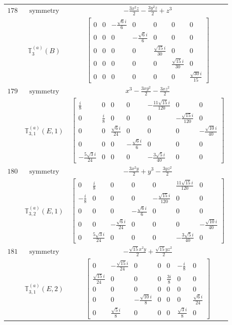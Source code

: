 \documentclass[fleqn,8pt,landscape]{jsarticle}
\begin{document}
\begin{longtable}{ccc}
$ 178 $ & $ \text{symmetry} $ & $ - \frac{3 x^{2} z}{2} - \frac{3 y^{2} z}{2} + z^{3} $ \\
$  $ & $ \mathbb{T}_{3}^{(a)}(B) $ & $ \begin{bmatrix} 0 & 0 & - \frac{\sqrt{6} i}{6} & 0 & 0 & 0 & 0 \\ 0 & 0 & 0 & - \frac{\sqrt{6} i}{6} & 0 & 0 & 0 \\ 0 & 0 & 0 & 0 & \frac{\sqrt{15} i}{30} & 0 & 0 \\ 0 & 0 & 0 & 0 & 0 & \frac{\sqrt{15} i}{30} & 0 \\ 0 & 0 & 0 & 0 & 0 & 0 & \frac{\sqrt{30} i}{15} \end{bmatrix} $ \\ \hline
$ 179 $ & $ \text{symmetry} $ & $ x^{3} - \frac{3 x y^{2}}{2} - \frac{3 x z^{2}}{2} $ \\
$  $ & $ \mathbb{T}_{3,1}^{(a)}(E,1) $ & $ \begin{bmatrix} \frac{i}{8} & 0 & 0 & 0 & - \frac{11 \sqrt{15} i}{120} & 0 & 0 \\ 0 & \frac{i}{8} & 0 & 0 & 0 & - \frac{\sqrt{15} i}{120} & 0 \\ 0 & 0 & \frac{\sqrt{6} i}{24} & 0 & 0 & 0 & - \frac{\sqrt{10} i}{40} \\ 0 & 0 & 0 & - \frac{\sqrt{6} i}{6} & 0 & 0 & 0 \\ - \frac{5 \sqrt{3} i}{24} & 0 & 0 & 0 & - \frac{3 \sqrt{5} i}{40} & 0 & 0 \end{bmatrix} $ \\ \hline
$ 180 $ & $ \text{symmetry} $ & $ - \frac{3 x^{2} y}{2} + y^{3} - \frac{3 y z^{2}}{2} $ \\
$  $ & $ \mathbb{T}_{3,2}^{(a)}(E,1) $ & $ \begin{bmatrix} 0 & \frac{i}{8} & 0 & 0 & 0 & \frac{11 \sqrt{15} i}{120} & 0 \\ - \frac{i}{8} & 0 & 0 & 0 & - \frac{\sqrt{15} i}{120} & 0 & 0 \\ 0 & 0 & 0 & - \frac{\sqrt{6} i}{6} & 0 & 0 & 0 \\ 0 & 0 & - \frac{\sqrt{6} i}{24} & 0 & 0 & 0 & - \frac{\sqrt{10} i}{40} \\ 0 & \frac{5 \sqrt{3} i}{24} & 0 & 0 & 0 & - \frac{3 \sqrt{5} i}{40} & 0 \end{bmatrix} $ \\ \hline
$ 181 $ & $ \text{symmetry} $ & $ - \frac{\sqrt{15} x^{2} y}{2} + \frac{\sqrt{15} y z^{2}}{2} $ \\
$  $ & $ \mathbb{T}_{3,1}^{(a)}(E,2) $ & $ \begin{bmatrix} 0 & - \frac{\sqrt{15} i}{24} & 0 & 0 & 0 & - \frac{i}{8} & 0 \\ \frac{\sqrt{15} i}{24} & 0 & 0 & 0 & \frac{3 i}{8} & 0 & 0 \\ 0 & 0 & 0 & 0 & 0 & 0 & 0 \\ 0 & 0 & - \frac{\sqrt{10} i}{8} & 0 & 0 & 0 & \frac{\sqrt{6} i}{24} \\ 0 & \frac{\sqrt{5} i}{8} & 0 & 0 & 0 & \frac{\sqrt{3} i}{8} & 0 \end{bmatrix} $ \\ \hline

\end{longtable}
\end{document}

